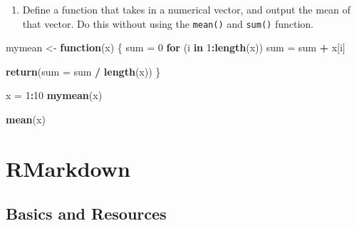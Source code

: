 \documentclass[
]{book}
\newenvironment{Shaded}{\begin{snugshade}}{\end{snugshade}}
\newcommand{\ControlFlowTok}[1]{\textcolor[rgb]{0.13,0.29,0.53}{\textbf{#1}}}
\newcommand{\DataTypeTok}[1]{\textcolor[rgb]{0.13,0.29,0.53}{#1}}
\newcommand{\DecValTok}[1]{\textcolor[rgb]{0.00,0.00,0.81}{#1}}
\newcommand{\KeywordTok}[1]{\textcolor[rgb]{0.13,0.29,0.53}{\textbf{#1}}}
\newcommand{\NormalTok}[1]{#1}
\newcommand{\OperatorTok}[1]{\textcolor[rgb]{0.81,0.36,0.00}{\textbf{#1}}}
\newcommand{\StringTok}[1]{\textcolor[rgb]{0.31,0.60,0.02}{#1}}
\providecommand{\tightlist}{%
  \setlength{\itemsep}{0pt}\setlength{\parskip}{0pt}}
\begin{document}
\begin{Shaded}
\end{Shaded}

\begin{enumerate}
\def\labelenumi{\arabic{enumi}.}
\setcounter{enumi}{3}
\tightlist
\item
  Define a function that takes in a numerical vector, and output the mean of that vector. Do this without using the \texttt{mean()} and \texttt{sum()} function.
\end{enumerate}

\begin{Shaded}
\begin{Highlighting}[]
\NormalTok{  mymean <-}\StringTok{ }\ControlFlowTok{function}\NormalTok{(x)}
\NormalTok{  \{}
\NormalTok{    sum =}\StringTok{ }\DecValTok{0}
    \ControlFlowTok{for}\NormalTok{ (i }\ControlFlowTok{in} \DecValTok{1}\OperatorTok{:}\KeywordTok{length}\NormalTok{(x))}
\NormalTok{      sum =}\StringTok{ }\NormalTok{sum }\OperatorTok{+}\StringTok{ }\NormalTok{x[i]}
    
    \KeywordTok{return}\NormalTok{(}\DataTypeTok{sum =}\NormalTok{ sum }\OperatorTok{/}\StringTok{ }\KeywordTok{length}\NormalTok{(x))}
\NormalTok{  \}}
  
\NormalTok{  x =}\StringTok{ }\DecValTok{1}\OperatorTok{:}\DecValTok{10}
  \KeywordTok{mymean}\NormalTok{(x)}
  
  \KeywordTok{mean}\NormalTok{(x)}
\end{Highlighting}
\end{Shaded}

\hypertarget{rmarkdown}{%
\chapter{RMarkdown}\label{rmarkdown}}

\hypertarget{basics-and-resources}{%
\section{Basics and Resources}\label{basics-and-resources}}
\end{document}
